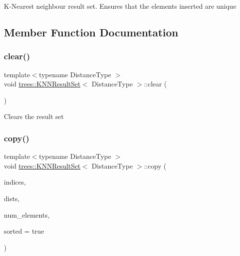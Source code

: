 K-\/\+Nearest neighbour result set. Ensures that the elements inserted are unique 

\subsection{Member Function Documentation}
\mbox{\label{classtrees_1_1_k_n_n_result_set_a6faafd1ae6f7dbe5a9fdcf03c244141c}} 
\subsubsection{\texorpdfstring{clear()}{clear()}}
{\footnotesize\ttfamily template$<$typename Distance\+Type $>$ \\
void \hyperlink{classtrees_1_1_k_n_n_result_set}{trees\+::\+K\+N\+N\+Result\+Set}$<$ Distance\+Type $>$\+::clear (\begin{DoxyParamCaption}{ }\end{DoxyParamCaption})\hspace{0.3cm}{\ttfamily [inline]}}

Clears the result set \mbox{\label{classtrees_1_1_k_n_n_result_set_a3e1b80d0f5c564f74d840c9838653a39}} 
\subsubsection{\texorpdfstring{copy()}{copy()}}
{\footnotesize\ttfamily template$<$typename Distance\+Type $>$ \\
void \hyperlink{classtrees_1_1_k_n_n_result_set}{trees\+::\+K\+N\+N\+Result\+Set}$<$ Distance\+Type $>$\+::copy (\begin{DoxyParamCaption}\item[{size\+\_\+t $\ast$}]{indices,  }\item[{Distance\+Type $\ast$}]{dists,  }\item[{size\+\_\+t}]{num\+\_\+elements,  }\item[{bool}]{sorted = {\ttfamily true} }\end{DoxyParamCaption})\hspace{0.3cm}{\ttfamily [inline]}}

